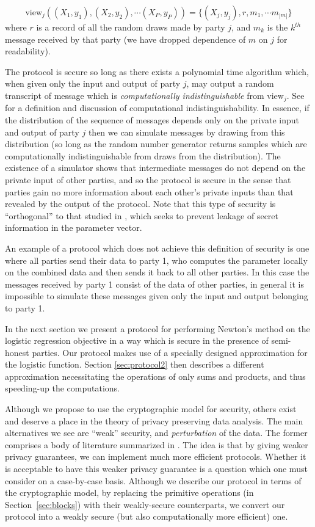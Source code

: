 \documentclass[11pt]{article}
\begin{document}
\begin{equation}\label{lr-view}
\text{view}_j((X_1,y_1),(X_2,y_2),\cdots (X_P,y_P)) = \{(X_j,y_j),r,m_1,\cdots m_{|m|} \}
\end{equation}
where $r$ is a record of all the random draws made by party $j$, and $m_k$ is the $k^{th}$ message received by that party (we have dropped dependence of $m$ on $j$ for readability).

The protocol is secure so long as there exists a polynomial time algorithm which, when given only the input and output of party $j$, may output a random transcript of message which is \emph{computationally indistinguishable} from $\text{view}_j$.   See  \citet{goldreich} for a definition and discussion of computational indistinguishability.  In essence, if the distribution of the sequence of messages depends only on the private input and output of party $j$ then we can simulate messages by drawing from this distribution (so long as the random number generator returns samples which are computationally indistinguishable from draws from the distribution).  The existence of a simulator shows that intermediate messages do not depend on the private input of other parties, and so the protocol is secure in the sense that parties gain no more information about each other's private inputs than that revealed by the output of the protocol.  Note that this type of security is ``orthogonal'' to that studied in \citet{Chaudhuri}, which seeks to prevent leakage of secret information in the parameter vector.

An example of a protocol which does not achieve this definition of security is one where all parties send their data to party 1, who computes the parameter locally on the combined data and then sends it back to all other parties.  In this case the messages received by party 1 consist of the data of other parties, in general it is impossible to simulate these messages given only the input and output belonging to party 1.

In the next section we present a protocol for performing Newton's method on the logistic regression objective in a way which is secure in the presence of semi-honest parties. Our protocol makes use of a specially designed approximation for the logistic function. Section \ref{sec:protocol2} then describes a different approximation necessitating  the operations of only sums and products, and thus speeding-up the computations.

Although we propose to use the cryptographic model for security, others exist and deserve a place in the theory of privacy preserving data analysis.  The main alternatives we see are ``weak'' security, and {\em perturbation} of the data.  The former comprises a body of literature summarized in \citet{ppdm_book}.  The idea is that by giving weaker privacy guarantees, we can implement much more efficient protocols.  Whether it is acceptable to have this weaker privacy guarantee is a question which one must   consider  on a case-by-case basis.  Although we describe our protocol in terms of the cryptographic model, by replacing the primitive operations (in Section~\ref{sec:blocks}) with their weakly-secure counterparts, we convert our protocol into a weakly secure (but also computationally more efficient) one.
\end{document}
